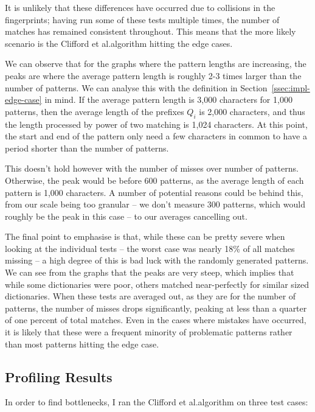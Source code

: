 \documentclass[ %
                    author={Dominic Joseph Moylett},
                    degree={MEng},
                     title={Dictionary Matching with Fingerprints},
                  subtitle={An Empirical Analysis},
                      type={research},
                      year={2015} ]{dissertation}
\begin{document}
It is unlikely that these differences have occurred due to collisions in the fingerprints; having run some of these tests multiple times, the number of matches has remained consistent throughout. This means that the more likely scenario is the Clifford et al.\@ algorithm hitting the edge cases.

We can observe that for the graphs where the pattern lengths are increasing, the peaks are where the average pattern length is roughly 2-3 times larger than the number of patterns. We can analyse this with the definition in Section~\ref{ssec:impl-edge-case} in mind. If the average pattern length is 3,000 characters for 1,000 patterns, then the average length of the prefixes $Q_i$ is 2,000 characters, and thus the length processed by power of two matching is 1,024 characters. At this point, the start and end of the pattern only need a few characters in common to have a period shorter than the number of patterns.

This doesn't hold however with the number of misses over number of patterns. Otherwise, the peak would be before 600 patterns, as the average length of each pattern is 1,000 characters. A number of potential reasons could be behind this, from our scale being too granular -- we don't measure 300 patterns, which would roughly be the peak in this case -- to our averages cancelling out.

The final point to emphasise is that, while these can be pretty severe when looking at the individual tests -- the worst case was nearly 18\% of all matches missing -- a high degree of this is bad luck with the randomly generated patterns. We can see from the graphs that the peaks are very steep, which implies that while some dictionaries were poor, others matched near-perfectly for similar sized dictionaries. When these tests are averaged out, as they are for the number of patterns, the number of misses drops significantly, peaking at less than a quarter of one percent of total matches. Even in the cases where mistakes have occurred, it is likely that these were a frequent minority of problematic patterns rather than most patterns hitting the edge case.

\subsection{Profiling Results}
\label{sec:profile-results}

In order to find bottlenecks, I ran the Clifford et al.\@ algorithm on three test cases:
\end{document}
